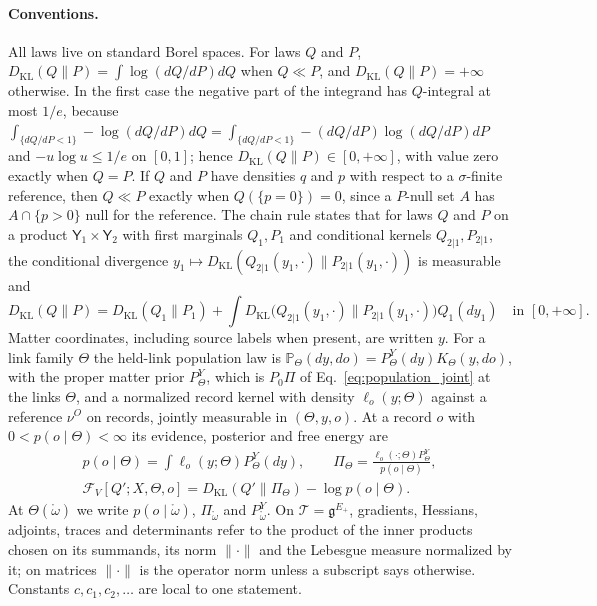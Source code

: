 \paragraph{Conventions.}
All laws live on standard Borel spaces. For laws $Q$ and $P$, $D_{\mathrm{KL}}(Q\|P)=\int\log(dQ/dP)dQ$ when $Q\ll P$, and $D_{\mathrm{KL}}(Q\|P)=+\infty$ otherwise. In the first case the negative part of the integrand has $Q$-integral at most $1/e$, because $\int_{\{dQ/dP<1\}}-\log(dQ/dP)dQ=\int_{\{dQ/dP<1\}}-(dQ/dP)\log(dQ/dP)dP$ and $-u\log u\leq1/e$ on $[0,1]$; hence $D_{\mathrm{KL}}(Q\|P)\in[0,+\infty]$, with value zero exactly when $Q=P$. If $Q$ and $P$ have densities $q$ and $p$ with respect to a $\sigma$-finite reference, then $Q\ll P$ exactly when $Q(\{p=0\})=0$, since a $P$-null set $A$ has $A\cap\{p>0\}$ null for the reference. The chain rule states that for laws $Q$ and $P$ on a product $\mathsf Y_1\times\mathsf Y_2$ with first marginals $Q_1,P_1$ and conditional kernels $Q_{2|1},P_{2|1}$, the conditional divergence $y_1\mapsto D_{\mathrm{KL}}(Q_{2|1}(y_1,\cdot)\|P_{2|1}(y_1,\cdot))$ is measurable and
\begin{equation}
D_{\mathrm{KL}}(Q\|P)=D_{\mathrm{KL}}(Q_1\|P_1)+\int D_{\mathrm{KL}}\bigl(Q_{2|1}(y_1,\cdot)\big\|P_{2|1}(y_1,\cdot)\bigr)Q_1(dy_1)
\quad\text{in }[0,+\infty].
\label{eq:llp_chain_rule}
\end{equation}
Matter coordinates, including source labels when present, are written $y$. For a link family $\Theta$ the held-link population law is $\mathbb P_\Theta(dy,do)=P^Y_\Theta(dy)K_\Theta(y,do)$, with the proper matter prior $P^Y_\Theta$, which is $P_0\Pi$ of Eq.~\eqref{eq:population_joint} at the links $\Theta$, and a normalized record kernel with density $\ell_o(y;\Theta)$ against a reference $\nu^O$ on records, jointly measurable in $(\Theta,y,o)$. At a record $o$ with $0<p(o\mid\Theta)<\infty$ its evidence, posterior and free energy are
\begin{equation}
\begin{gathered}
p(o\mid\Theta)=\int\ell_o(y;\Theta)P^Y_\Theta(dy),\qquad
\Pi_\Theta=\frac{\ell_o(\cdot;\Theta)P^Y_\Theta}{p(o\mid\Theta)},\\
\mathcal F_V[Q';X,\Theta,o]=D_{\mathrm{KL}}(Q'\|\Pi_\Theta)-\log p(o\mid\Theta).
\end{gathered}
\label{eq:llp_held_objects}
\end{equation}
At $\Theta(\mathring\omega)$ we write $p(o\mid\mathring\omega)$, $\Pi_{\mathring\omega}$ and $P^Y_{\mathring\omega}$. On $\mathcal T=\mathfrak g^{E_+}$, gradients, Hessians, adjoints, traces and determinants refer to the product of the inner products chosen on its summands, its norm $\|\cdot\|$ and the Lebesgue measure normalized by it; on matrices $\|\cdot\|$ is the operator norm unless a subscript says otherwise. Constants $c,c_1,c_2,\ldots$ are local to one statement.

